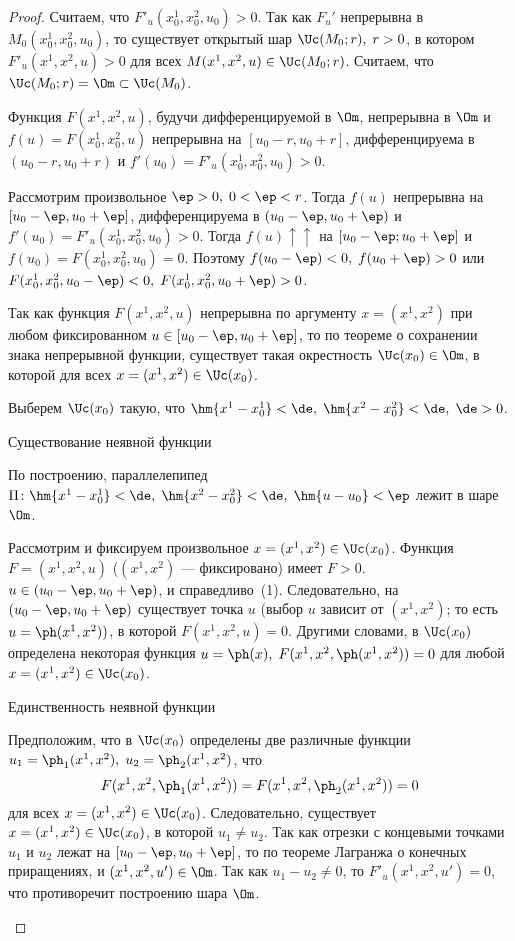 \documentclass[a4paper]{article}
\begin{document}
\begin{proof}
Считаем, что $F'_u(x_0^1,x_0^2,u_0) > 0$. Так как $F_u'$ непрерывна
в $M_0(x_0^1,x_0^2,u_0)$, то существует открытый шар $\Uc(M_0;r), \;
r>0$, в котором $F'_u(x^1,x^2,u) > 0$ для всех $M(x^1,x^2,u) \in
\Uc(M_0;r)$. Считаем, что $\Uc(M_0;r) = \Om \subset \Uc(M_0)$.

Функция $F(x^1,x^2,u)$, будучи дифференцируемой в $\Om$, непрерывна
в $\Om$ и $f(u) = F(x_0^1,x_0^2,u)$ непрерывна на $[u_0-r, u_0+r]$,
дифференцируема в $(u_0-r,u_0+r)$ и $f'(u_0) = F'_u(x_0^1,x_0^2,u_0)
> 0$.

Рассмотрим произвольное $\ep>0, \; 0<\ep < r$. Тогда $f(u)$
непрерывна на $[u_0-\ep, u_0+\ep]$, дифференцируема в $(u_0 - \ep,
u_0 + \ep)$ и $f'(u_0) = F'_u(x_0^1,x_0^2,u_0)>0$. Тогда $f(u)
\uparrow\uparrow$ на $[u_0-\ep; u_0+\ep]$ и $f(u_0) =
F(x_0^1,x_0^2,u_0)=0$. Поэтому $f(u_0-\ep) < 0, \; f(u_0+\ep) > 0$
или $F(x_0^1,x_0^2, u_0 - \ep) < 0, \; F(x_0^1,x_0^2,u_0 + \ep)>0$.

Так как функция $F(x^1,x^2,u)$ непрерывна по аргументу $x=(x^1,x^2)$
при любом фиксированном $u \in [u_0-\ep, u_0+\ep]$, то по теореме о
сохранении знака непрерывной функции, существует такая окрестность
$\Uc(x_0) \in \Om$, в которой  для всех $x=(x^1,x^2) \in \Uc(x_0)$.

Выберем $\Uc(x_0)$ такую, что $\hm{x^1 - x_0^1} < \de, \; \hm{x^2 -
x_0^2} < \de, \; \de>0$.

\begin{points}{-1}
\item Существование неявной функции

По построению, параллелепипед $\Pi\colon \hm{x^1-x^1_0} < \de, \;
\hm{x^2 - x^2_0} < \de, \; \hm{u-u_0} < \ep$ лежит в шаре $\Om$.

Рассмотрим и фиксируем произвольное $x=(x^1,x^2) \in \Uc(x_0)$.
Функция $F=(x^1,x^2,u)$ ($(x^1,x^2)$ --- фиксировано) имеет $F>0$.
$u\in(u_0 - \ep, u_0 + \ep)$, и справедливо~(1). Следовательно, на
$( u_0 - \ep, u_0 + \ep)$ существует точка $u$ (выбор $u$ зависит от
$(x^1,x^2)$; то есть $u=\ph(x^1,x^2))$, в которой $F(x^1,x^2,u) =
0$. Другими словами, в $\Uc(x_0)$ определена некоторая функция
$u=\ph(x), \; F(x^1,x^2, \ph(x^1,x^2))=0$ для любой $x=(x^1,x^2) \in
\Uc(x_0)$.

\item Единственность неявной функции

Предположим, что в $\Uc(x_0)$ определены две различные функции $u_1
= \ph_1(x^1,x^2), \; u_2=\ph_2(x^1,x^2)$, что $$F(x^1,x^2,
\ph_1(x^1,x^2)) = F(x^1,x^2, \ph_2(x^1,x^2)) = 0$$ для всех
$x=(x^1,x^2) \in \Uc(x_0)$. Следовательно, существует $x=(x^1,x^2)
\in \Uc(x_0)$, в которой $u_1\ne u_2$. Так как отрезки с концевыми
точками $u_1$ и $u_2$ лежат на $[u_0 - \ep,u_0+\ep]$, то по теореме
Лагранжа о конечных приращениях,  и $(x^1,x^2,u')
\in\Om$. Так как $u_1-u_2\ne0$, то $F'_u(x^1,x^2, u')=0$, что
противоречит построению шара $\Om$.


\end{points}
\end{proof}
\end{document}
